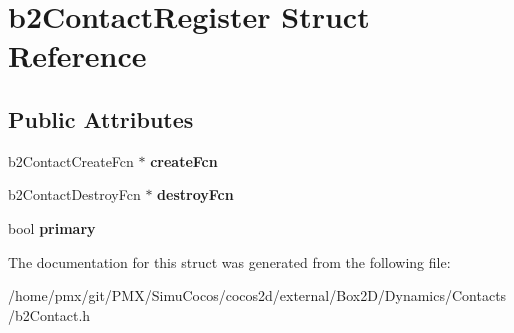 \hypertarget{structb2ContactRegister}{}\section{b2\+Contact\+Register Struct Reference}
\label{structb2ContactRegister}
\subsection*{Public Attributes}
\begin{DoxyCompactItemize}
\item 
\mbox{\label{structb2ContactRegister_af23f356ae7bc595e68c3ae0c1a26040c}} 
b2\+Contact\+Create\+Fcn $\ast$ {\bfseries create\+Fcn}
\item 
\mbox{\label{structb2ContactRegister_ad2b3ad488697539a5425764202595d0d}} 
b2\+Contact\+Destroy\+Fcn $\ast$ {\bfseries destroy\+Fcn}
\item 
\mbox{\label{structb2ContactRegister_a43f2d79909505b785b9034b21a56525e}} 
bool {\bfseries primary}
\end{DoxyCompactItemize}


The documentation for this struct was generated from the following file\+:\begin{DoxyCompactItemize}
\item 
/home/pmx/git/\+P\+M\+X/\+Simu\+Cocos/cocos2d/external/\+Box2\+D/\+Dynamics/\+Contacts/b2\+Contact.\+h\end{DoxyCompactItemize}
